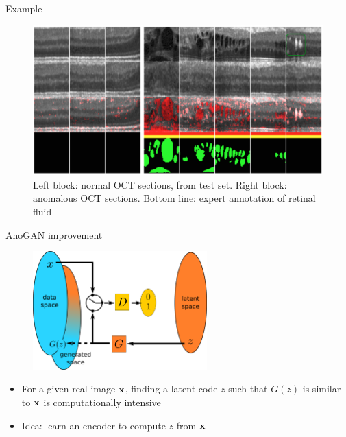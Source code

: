 \documentclass[xcolor=pdftex,dvipsnames,table,mathserif]{beamer}
\begin{document}
\begin{frame}{Example~\tiny{\cite{schlegl_unsupervised_2017}}}


  \begin{figure}[ht]
    \centering
    \includegraphics[width=\textwidth]{res_oct}
    \caption*{Left block: normal OCT sections, from test set. Right block: anomalous OCT sections. Bottom line: expert annotation of retinal fluid}
  \end{figure}

\end{frame}


\begin{frame}{AnoGAN improvement}

  \begin{figure}[ht]
    \centering
    \includegraphics[width=0.6\textwidth]{gan2}
  \end{figure}

  \begin{itemize}
  \item For a given real image $\mathbf{x}$, finding a latent code $z$ such that $G(z)$ is similar to $\mathbf{x}$ is computationally intensive
  \item Idea: learn an encoder to compute $z$ from $\mathbf{x}$
  \end{itemize}

\end{frame}
\end{document}
